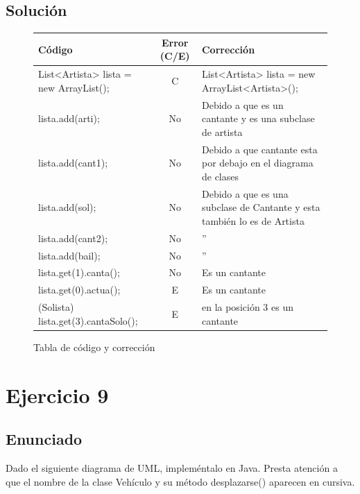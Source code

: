 \documentclass[a4paper,12pt]{article}
\begin{document}
    \subsection{Solución}
    
    \begin{figure}[H]
        \centering
        \begin{tabular}{|l|c|p{5cm}|}
        \hline
        \textbf{Código} & \textbf{Error (C/E)} & \textbf{Corrección} \\ \hline
        List<Artista> lista = new ArrayList(); & C & List<Artista> lista = new ArrayList<Artista>(); \\ \hline
        lista.add(arti); & No & Debido a que es un cantante y es una subclase de artista \\ \hline
        lista.add(cant1); & No & Debido a que cantante esta por debajo en el diagrama de clases \\ \hline
        lista.add(sol); & No & Debido a que es una subclase de Cantante y esta también lo es de Artista \\ \hline
        lista.add(cant2); & No & '' \\ \hline
        lista.add(bail); & No & '' \\ \hline
        lista.get(1).canta(); & No & Es un cantante \\ \hline
        lista.get(0).actua(); & E & Es un cantante \\ \hline
        (Solista) lista.get(3).cantaSolo(); & E & en la posición 3 es un cantante \\ \hline
        \end{tabular}
        \caption{Tabla de código y corrección}
    \end{figure}


    

\section{Ejercicio 9}

\subsection{Enunciado}

Dado el siguiente diagrama de UML, impleméntalo en Java. Presta atención a que el
nombre de la clase Vehículo y su método desplazarse() aparecen en cursiva.
\end{document}
